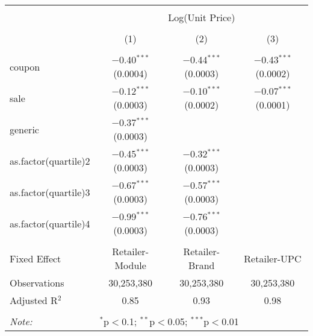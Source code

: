 
\begin{table}[!htbp] \centering 
  \caption{} 
  \label{tab:overallSavingsStorable} 
\begin{tabular}{@{\extracolsep{5pt}}lccc} 
\\[-1.8ex]\hline 
\hline \\[-1.8ex] 
 & \multicolumn{3}{c}{Log(Unit Price)} \\ 
\\[-1.8ex] & (1) & (2) & (3)\\ 
\hline \\[-1.8ex] 
 coupon & $-$0.40$^{***}$ (0.0004) & $-$0.44$^{***}$ (0.0003) & $-$0.43$^{***}$ (0.0002) \\ 
  sale & $-$0.12$^{***}$ (0.0003) & $-$0.10$^{***}$ (0.0002) & $-$0.07$^{***}$ (0.0001) \\ 
  generic & $-$0.37$^{***}$ (0.0003) &  &  \\ 
  as.factor(quartile)2 & $-$0.45$^{***}$ (0.0003) & $-$0.32$^{***}$ (0.0003) &  \\ 
  as.factor(quartile)3 & $-$0.67$^{***}$ (0.0003) & $-$0.57$^{***}$ (0.0003) &  \\ 
  as.factor(quartile)4 & $-$0.99$^{***}$ (0.0003) & $-$0.76$^{***}$ (0.0003) &  \\ 
 \hline \\[-1.8ex] 
Fixed Effect & Retailer-Module & Retailer-Brand & Retailer-UPC \\ 
Observations & 30,253,380 & 30,253,380 & 30,253,380 \\ 
Adjusted R$^{2}$ & 0.85 & 0.93 & 0.98 \\ 
\hline 
\hline \\[-1.8ex] 
\textit{Note:}  & \multicolumn{3}{l}{$^{*}$p$<$0.1; $^{**}$p$<$0.05; $^{***}$p$<$0.01} \\ 
\end{tabular} 
\end{table} 

